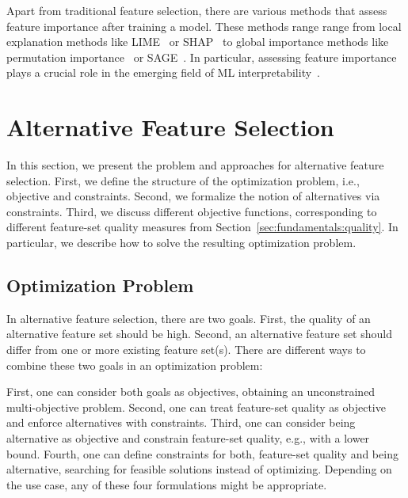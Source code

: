 \documentclass{article}
\theoremstyle{definition}
\begin{document}
Apart from traditional feature selection, there are various methods that assess feature importance after training a model.
These methods range range from local explanation methods like LIME~\cite{ribeiro2016should} or SHAP~\cite{lundberg2017unified} to global importance methods like permutation importance~\cite{breiman2001random} or SAGE~\cite{covert2020understanding}.
In particular, assessing feature importance plays a crucial role in the emerging field of ML interpretability~\cite{carvalho2019machine}.

\section{Alternative Feature Selection}
\label{sec:approach}

In this section, we present the problem and approaches for alternative feature selection.
First, we define the structure of the optimization problem, i.e., objective and constraints.
Second, we formalize the notion of alternatives via constraints.
Third, we discuss different objective functions, corresponding to different feature-set quality measures from Section~\ref{sec:fundamentals:quality}.
In particular, we describe how to solve the resulting optimization problem.

\subsection{Optimization Problem}
\label{sec:approach:problem}

In alternative feature selection, there are two goals.
First, the quality of an alternative feature set should be high.
Second, an alternative feature set should differ from one or more existing feature set(s).
There are different ways to combine these two goals in an optimization problem:

First, one can consider both goals as objectives, obtaining an unconstrained multi-objective problem.
Second, one can treat feature-set quality as objective and enforce alternatives with constraints.
Third, one can consider being alternative as objective and constrain feature-set quality, e.g., with a lower bound.
Fourth, one can define constraints for both, feature-set quality and being alternative, searching for feasible solutions instead of optimizing.
Depending on the use case, any of these four formulations might be appropriate.
\end{document}
